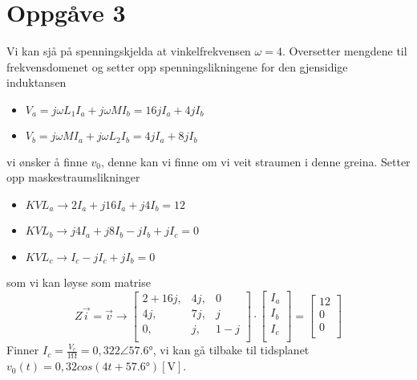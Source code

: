 \documentclass[12pt,a4paper]{article}
\begin{document}
  \section*{Oppgåve 3}
    Vi kan sjå på spenningskjelda at vinkelfrekvensen $\omega = 4$. Oversetter mengdene til
    frekvensdomenet og setter opp spenningslikningene for den gjensidige induktansen
    \begin{itemize}
      \item $V_a = j\omega L_1I_a + j\omega MI_b = 16jI_a + 4jI_b$
      \item $V_b = j\omega MI_a + j\omega L_2I_b = 4jI_a + 8jI_b$
    \end{itemize}
    vi ønsker å finne $v_0$, denne kan vi finne om vi veit straumen i denne greina. Setter
    opp maskestraumslikninger
    \begin{itemize}
      \item $KVL_a\rightarrow 2I_a + j16I_a + j4I_b = 12$
      \item $KVL_b\rightarrow j4I_a + j8I_b -jI_b + jI_c = 0$
      \item $KVL_c\rightarrow I_c - jI_c + jI_b = 0$
    \end{itemize}
    som vi kan løyse som matrise
    \begin{equation}
      Z\vec{i} = \vec{v} \rightarrow
      \left[ \begin{array}{ccc}
        2+16j, & 4j, & 0 \\
        4j, & 7j, & j \\
        0, & j, & 1-j \\
      \end{array} \right]
      \cdot
      \left[ \begin{array}{c}
        I_a \\
        I_b \\
        I_c \\
      \end{array} \right]
      =
      \left[ \begin{array}{c}
        12 \\
        0 \\
        0 \\
      \end{array} \right]
    \end{equation}
    Finner $I_c = \frac{V_c}{1\si{\ohm}} = 0,322\angle \ang{57.6}$, vi kan gå tilbake til tidsplanet
    $v_0(t) = 0,32cos(4t + \ang{57.6})[\si{\volt}]$.
\end{document}
